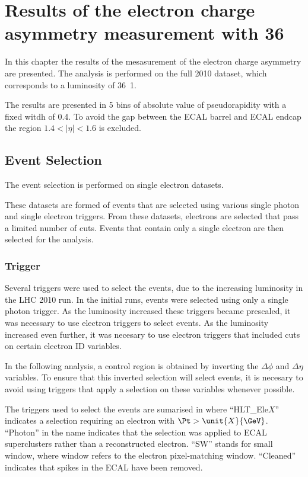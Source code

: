 \chapter[Electron Charge Asymmetry]{Results of the electron charge asymmetry
measurement with \unit{36}{\invpb} }

In this chapter the results of the mesasurement of the electron charge
asymmetry are presented. The analysis is performed on the full 2010 dataset, which corresponds to a
luminosity of \unit{36.1}{\invpb}.

The results are presented in 5 bins of absolute value of pseudorapidity with a
fixed witdh of 0.4. To avoid the gap between the ECAL barrel and ECAL endcap the
region $1.4<|\eta|<1.6$ is excluded.

\section{Event Selection}

The event selection is performed on single electron datasets. 

These datasets are formed of events that are selected using various single photon and single
electron triggers. From these datasets, electrons are selected that pass a limited
number of cuts. Events that contain only a single electron are then selected for
the analysis.

\subsection{Trigger}

Several triggers were used to select the events, due to the increasing
luminosity in the \ac{LHC} 2010 run.
In the initial runs, events were selected using only a single photon trigger. 
As the luminosity increased these triggers became prescaled, it was
necessary to use electron triggers to select events. 
As the luminosity increased even further, it was necesary to use electron
triggers that included cuts on certain electron ID variables.

In the following analysis, a control region is obtained by inverting the
$\Delta\phi$ and $\Delta\eta$ variables. To ensure that this inverted selection
will select events, it is necesary to avoid using triggers that apply a
selection on these variables whenever possible.

The triggers used to select the events are sumarised in 
where ``HLT\_Ele$X$'' indicates a selection requiring an electron with  $\Pt > \unit{X}{\GeV}$. 
``Photon'' in the name indicates that the selection was applied to ECAL
superclusters rather than a reconstructed electron. 
``SW'' stands for small window, where window refers to the electron
pixel-matching window. 
 ``Cleaned'' indicates that spikes in the \ac{ECAL} have been removed.  

